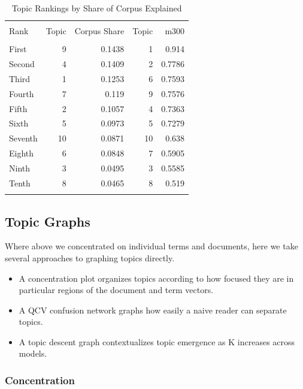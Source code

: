 \documentclass[]{book}
\providecommand{\tightlist}{%
  \setlength{\itemsep}{0pt}\setlength{\parskip}{0pt}}
\theoremstyle{definition}
\theoremstyle{definition}
\theoremstyle{definition}
\theoremstyle{remark}
\begin{document}
\begin{table}[!htbp] \centering 
  \caption{Topic Rankings by Share of Corpus Explained} 
  \label{tab:topshare} 
\begin{tabular}{@{\extracolsep{5pt}} lrrrr} 
\\[-1.8ex]\hline 
\hline \\[-1.8ex] 
Rank & Topic  & Corpus Share & Topic & m300 \\ 
\hline \\[-1.8ex] 
First & 9 & 0.1438 & 1 & 0.914 \\ 
Second & 4 & 0.1409 & 2 & 0.7786 \\ 
Third & 1 & 0.1253 & 6 & 0.7593 \\ 
Fourth & 7 & 0.119 & 9 & 0.7576 \\ 
Fifth & 2 & 0.1057 & 4 & 0.7363 \\ 
Sixth & 5 & 0.0973 & 5 & 0.7279 \\ 
Seventh & 10 & 0.0871 & 10 & 0.638 \\ 
Eighth & 6 & 0.0848 & 7 & 0.5905 \\ 
Ninth & 3 & 0.0495 & 3 & 0.5585 \\ 
Tenth & 8 & 0.0465 & 8 & 0.519 \\ 
\hline \\[-1.8ex] 
\end{tabular} 
\end{table}

\hypertarget{topic-graphs}{%
\subsection{Topic Graphs}\label{topic-graphs}}

Where above we concentrated on individual terms and documents, here we
take several approaches to graphing topics directly.

\begin{itemize}
\tightlist
\item
  A concentration plot organizes topics according to how focused they
  are in particular regions of the document and term vectors.
\item
  A QCV confusion network graphs how easily a naive reader can separate
  topics.
\item
  A topic descent graph contextualizes topic emergence as K increases
  across models.
\end{itemize}

\hypertarget{concentration}{%
\subsubsection{Concentration}\label{concentration}}
\end{document}
